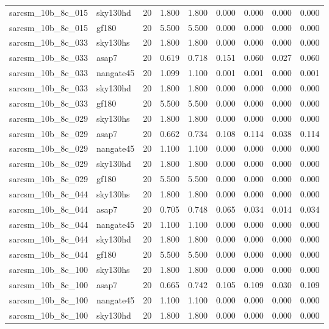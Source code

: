 \begin{tabular}{llrrrrrrr}
sarcsm\_10b\_8c\_015 & sky130hd & 20 & 1.800 & 1.800 & 0.000 & 0.000 & 0.000 & 0.000 \\
sarcsm\_10b\_8c\_015 & gf180 & 20 & 5.500 & 5.500 & 0.000 & 0.000 & 0.000 & 0.000 \\
sarcsm\_10b\_8c\_033 & sky130hs & 20 & 1.800 & 1.800 & 0.000 & 0.000 & 0.000 & 0.000 \\
sarcsm\_10b\_8c\_033 & asap7 & 20 & 0.619 & 0.718 & 0.151 & 0.060 & 0.027 & 0.060 \\
sarcsm\_10b\_8c\_033 & nangate45 & 20 & 1.099 & 1.100 & 0.001 & 0.001 & 0.000 & 0.001 \\
sarcsm\_10b\_8c\_033 & sky130hd & 20 & 1.800 & 1.800 & 0.000 & 0.000 & 0.000 & 0.000 \\
sarcsm\_10b\_8c\_033 & gf180 & 20 & 5.500 & 5.500 & 0.000 & 0.000 & 0.000 & 0.000 \\
sarcsm\_10b\_8c\_029 & sky130hs & 20 & 1.800 & 1.800 & 0.000 & 0.000 & 0.000 & 0.000 \\
sarcsm\_10b\_8c\_029 & asap7 & 20 & 0.662 & 0.734 & 0.108 & 0.114 & 0.038 & 0.114 \\
sarcsm\_10b\_8c\_029 & nangate45 & 20 & 1.100 & 1.100 & 0.000 & 0.000 & 0.000 & 0.000 \\
sarcsm\_10b\_8c\_029 & sky130hd & 20 & 1.800 & 1.800 & 0.000 & 0.000 & 0.000 & 0.000 \\
sarcsm\_10b\_8c\_029 & gf180 & 20 & 5.500 & 5.500 & 0.000 & 0.000 & 0.000 & 0.000 \\
sarcsm\_10b\_8c\_044 & sky130hs & 20 & 1.800 & 1.800 & 0.000 & 0.000 & 0.000 & 0.000 \\
sarcsm\_10b\_8c\_044 & asap7 & 20 & 0.705 & 0.748 & 0.065 & 0.034 & 0.014 & 0.034 \\
sarcsm\_10b\_8c\_044 & nangate45 & 20 & 1.100 & 1.100 & 0.000 & 0.000 & 0.000 & 0.000 \\
sarcsm\_10b\_8c\_044 & sky130hd & 20 & 1.800 & 1.800 & 0.000 & 0.000 & 0.000 & 0.000 \\
sarcsm\_10b\_8c\_044 & gf180 & 20 & 5.500 & 5.500 & 0.000 & 0.000 & 0.000 & 0.000 \\
sarcsm\_10b\_8c\_100 & sky130hs & 20 & 1.800 & 1.800 & 0.000 & 0.000 & 0.000 & 0.000 \\
sarcsm\_10b\_8c\_100 & asap7 & 20 & 0.665 & 0.742 & 0.105 & 0.109 & 0.030 & 0.109 \\
sarcsm\_10b\_8c\_100 & nangate45 & 20 & 1.100 & 1.100 & 0.000 & 0.000 & 0.000 & 0.000 \\
sarcsm\_10b\_8c\_100 & sky130hd & 20 & 1.800 & 1.800 & 0.000 & 0.000 & 0.000 & 0.000 \\

\end{tabular}
